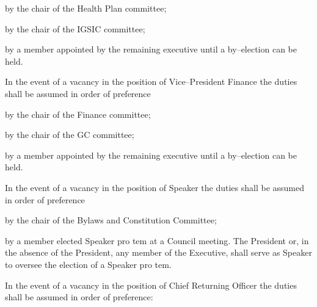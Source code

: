 \begin{longenum}[ label*=\thesubsection.\arabic*., align=left]
\begin{longenum}[ label*=\arabic*., align=left]
\begin{longenum}[ label*=\arabic*., align=left]
				\item by the chair of the Health Plan committee;
				\item by the chair of the IGSIC committee;
				\item by a member appointed by the remaining executive until a by--election can be held.
			\end{longenum}
			\item In the event of a vacancy in the position of Vice--President Finance the duties shall be assumed in order of preference
			\begin{longenum}[ label*=\arabic*., align=left]
				\item by the chair of the Finance committee;
				\item by the chair of the GC committee;
				\item by a member appointed by the remaining executive until a by--election can be held.
			\end{longenum}
			\item In the event of a vacancy in the position of Speaker the duties shall be assumed in order of preference
			\begin{longenum}[ label*=\arabic*., align=left]
				\item by the chair of the Bylaws and Constitution Committee;
				\item by a member elected Speaker pro tem at a Council meeting. The President or, in the absence of the President, any member of the Executive, shall serve as Speaker to oversee the election of a Speaker pro tem.
			\end{longenum}
			\item In the event of a vacancy in the position of Chief Returning Officer the duties shall be assumed in order of preference:
			\begin{longenum}[ label*=\arabic*., align=left]

\end{longenum}
\end{longenum}
\end{longenum}
